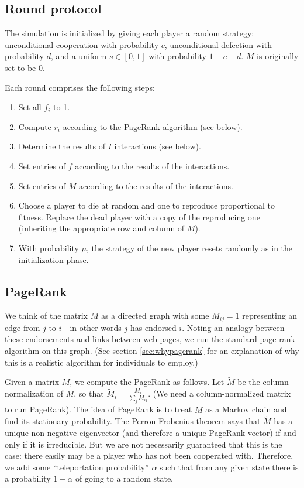 \documentclass{amsart}
\begin{document}
\subsection{Round protocol}
The simulation is initialized by giving each player a random strategy:
unconditional cooperation with probability $c$, unconditional
defection with probability $d$, and a uniform $s \in [0,1]$ with
probability $1 - c- d$. $M$ is originally set to be $0$.

Each round comprises the following steps:

\begin{enumerate}
\item Set all $f_i$ to 1.
\item Compute $r_i$ according to the PageRank algorithm (see below).
\item Determine the results of $I$ interactions (see below).
\item Set entries of $f$ according to the results of the interactions.
\item Set entries of $M$ according to the results of the interactions.
\item Choose a player to die at random and one to reproduce
  proportional to fitness. Replace the dead player with a copy of the
  reproducing one (inheriting the appropriate row and column of $M$).
\item With probability $\mu$, the strategy of the new player resets
  randomly as in the initialization phase.
\end{enumerate}

\subsection{PageRank}
\newcommand{\tM}{\tilde M} We think of the matrix $M$ as a directed
graph with some $M_{ij} = 1$ representing an edge from $j$ to $i$---in
other words $j$ has endorsed $i$. Noting an analogy between these
endorsements and links between web pages, we run the standard page
rank algorithm on this graph. (See section \ref{sec:whypagerank} for
an explanation of why this is a realistic algorithm for individuals to
employ.)

Given a matrix $M$, we compute the PageRank as follows. Let $\tM$ be
the column-normalization of $M$, so that $\tM_i = \frac{M_i}{\sum_j
  M_{ij}}$. (We need a column-normalized matrix to run PageRank). The
idea of PageRank is to treat $\tM$ as a Markov chain and find its
stationary probability. The Perron-Frobenius theorem says that $\tM$
has a unique non-negative eigenvector (and therefore a unique PageRank
vector) if and only if it is irreducible. But we are not necessarily
guaranteed that this is the case: there easily may be a player who has
not been cooperated with. Therefore, we add some ``teleportation
probability'' $\alpha$ such that from any given state there is a
probability $1-\alpha$ of going to a random state.
\end{document}
